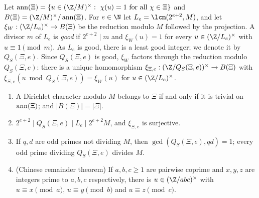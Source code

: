 \begin{definition}\label{pf:top-supply:anyQSdef}
Let $\topsupplyann(\Xi)=\{u\in(\Z/M)^\times:\ \chi(u)=1\text{ for all }\chi\in\Xi\}$ and
$B(\Xi)=(\Z/M)^\times/\topsupplyann(\Xi)$. For $e\in\N$ let $L_e=\lcm(2^{e+2},M)$, and let
$\xi_W:(\Z/L_e)^\times\to B(\Xi)$ be the reduction modulo $M$ followed by the projection. A divisor $m$ of $L_e$ is
\emph{good} if $2^{e+2}\mid m$ and $\xi_W(u)=1$ for every $u\in(\Z/L_e)^\times$ with $u\equiv1\pmod m$. As $L_e$ is good,
there is a least good integer; we denote it by $Q_S(\Xi,e)$. Since $Q_S(\Xi,e)$ is good, $\xi_W$ factors through the
reduction modulo $Q_S(\Xi,e)$: there is a unique homomorphism $\xi_{\Xi,e}:(\Z/Q_S(\Xi,e))^\times\to B(\Xi)$ with
$\xi_{\Xi,e}(u\bmod Q_S(\Xi,e))=\xi_W(u)$ for $u\in(\Z/L_e)^\times$.
  
  
\end{definition}

\begin{lemma}\label{pf:top-supply:anyQS}
\begin{enumerate}[label=(\roman*)]
\item A Dirichlet character modulo $M$ belongs to $\Xi$ if and only if it is trivial on $\operatorname{ann}(\Xi)$; and
$|B(\Xi)|=|\Xi|$.
\item $2^{e+2}\mid Q_S(\Xi,e)\mid L_e\mid2^{e+2}M$, and $\xi_{\Xi,e}$ is surjective.
\item If $q,d$ are odd primes not dividing $M$, then $\gcd(Q_S(\Xi,e),qd)=1$; every odd prime dividing $Q_S(\Xi,e)$ divides
$M$.
\item (Chinese remainder theorem) If $a,b,c\ge1$ are pairwise coprime and $x,y,z$ are integers prime to $a,b,c$
respectively, there is $u\in(\Z/abc)^\times$ with $u\equiv x\pmod a$, $u\equiv y\pmod b$ and $u\equiv z\pmod c$.
\end{enumerate}
 
\end{lemma}

